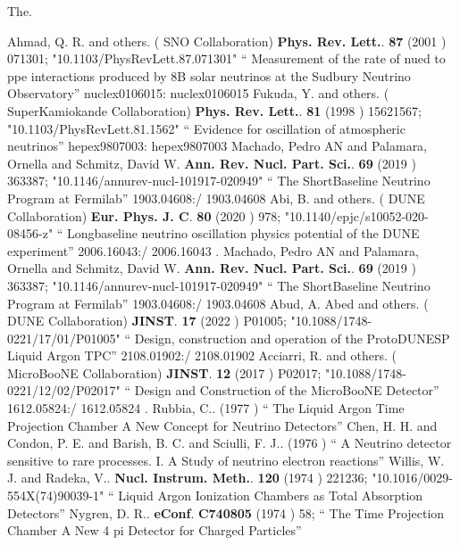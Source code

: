 \documentclass{article}
\begin{document}
  The. \nocite{*}

  \begin{thebibliography}{99}
      Ahmad, Q. R. and others. ( SNO Collaboration) {\bf  Phys. Rev. Lett.}. {\bf  87} (2001 )  071301;  "10.1103/PhysRevLett.87.071301" `` Measurement of the rate of nued to ppe interactions produced by 8B solar neutrinos at the Sudbury Neutrino Observatory'' nuclex0106015: nuclex0106015
  Fukuda, Y. and others. ( SuperKamiokande Collaboration) {\bf  Phys. Rev. Lett.}. {\bf  81} (1998 )  15621567;  "10.1103/PhysRevLett.81.1562" `` Evidence for oscillation of atmospheric neutrinos'' hepex9807003: hepex9807003
  Machado, Pedro AN and Palamara, Ornella and Schmitz, David W. {\bf  Ann. Rev. Nucl. Part. Sci.}. {\bf  69} (2019 )  363387;  "10.1146/annurev-nucl-101917-020949" `` The ShortBaseline Neutrino Program at Fermilab'' 1903.04608:/ 1903.04608
  Abi, B. and others. ( DUNE Collaboration) {\bf  Eur. Phys. J. C}. {\bf  80} (2020 )  978;  "10.1140/epjc/s10052-020-08456-z" `` Longbaseline neutrino oscillation physics potential of the DUNE experiment'' 2006.16043:/ 2006.16043
 . 
  Machado, Pedro AN and Palamara, Ornella and Schmitz, David W. {\bf  Ann. Rev. Nucl. Part. Sci.}. {\bf  69} (2019 )  363387;  "10.1146/annurev-nucl-101917-020949" `` The ShortBaseline Neutrino Program at Fermilab'' 1903.04608:/ 1903.04608
  Abud, A. Abed and others. ( DUNE Collaboration) {\bf  JINST}. {\bf  17} (2022 )  P01005;  "10.1088/1748-0221/17/01/P01005" `` Design, construction and operation of the ProtoDUNESP Liquid Argon TPC'' 2108.01902:/ 2108.01902
  Acciarri, R. and others. ( MicroBooNE Collaboration) {\bf  JINST}. {\bf  12} (2017 )  P02017;  "10.1088/1748-0221/12/02/P02017" `` Design and Construction of the MicroBooNE Detector'' 1612.05824:/ 1612.05824
 . 
  Rubbia, C.. (1977 ) `` The Liquid Argon Time Projection Chamber A New Concept for Neutrino Detectors''
  Chen, H. H. and Condon, P. E. and Barish, B. C. and Sciulli, F. J.. (1976 ) `` A Neutrino detector sensitive to rare processes. I. A Study of neutrino electron reactions''
  Willis, W. J. and Radeka, V.. {\bf  Nucl. Instrum. Meth.}. {\bf  120} (1974 )  221236;  "10.1016/0029-554X(74)90039-1" `` Liquid Argon Ionization Chambers as Total Absorption Detectors''
  Nygren, D. R.. {\bf  eConf}. {\bf  C740805} (1974 )  58; `` The Time Projection Chamber A New 4 pi Detector for Charged Particles''

\end{thebibliography}
\end{document}
